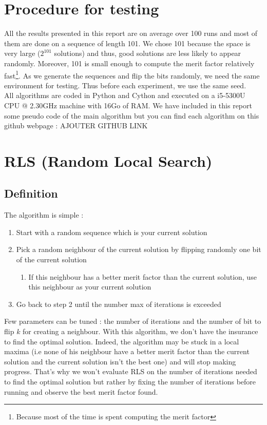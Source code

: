 \documentclass[a4paper,11pt,openany]{article}
\begin{document}
\section{Procedure for testing}
\noindent
All the results presented in this report are on average over 100 runs and most of them are done on a sequence of length 101. We chose 101 because the space is very large ($2^{101}$ solutions) and thus, good solutions are less likely to appear randomly. Moreover, 101 is small enough to compute the merit factor relatively fast\footnote{Because most of the time is spent computing the merit factor}. As we generate the sequences and flip the bits randomly, we need the same environment for testing. Thus before each experiment, we use the same seed.\\
All algorithms are coded in Python and Cython and executed on a i5-5300U CPU @ 2.30GHz machine with 16Go of RAM. We have included in this report some pseudo code of the main algorithm but you can find each algorithm on this github webpage : AJOUTER GITHUB LINK
\section{RLS (Random Local Search)}
\subsection{Definition}
\noindent
The algorithm is simple \cite{rls}:
\begin{enumerate}
\item Start with a random sequence which is your current solution
\item Pick a random neighbour of the current solution by flipping randomly one bit of the current solution
\begin{enumerate}
\item If this neighbour has a better merit factor than the current solution, use this neighbour as your current solution
\end{enumerate}
\item Go back to step 2 until the number max of iterations is exceeded
\end{enumerate}
Few parameters can be tuned : the number of iterations and the number of bit to flip $k$ for creating a neighbour. With this algorithm, we don't have the insurance to find the optimal solution. Indeed, the algorithm may be stuck in a local maxima (i.e none of his neighbour have a better merit factor than the current solution and the current solution isn't the best one) and will stop making progress. That's why we won't evaluate RLS on the number of iterations needed to find the optimal solution but rather by fixing the number of iterations before running and observe the best merit factor found.
\end{document}
